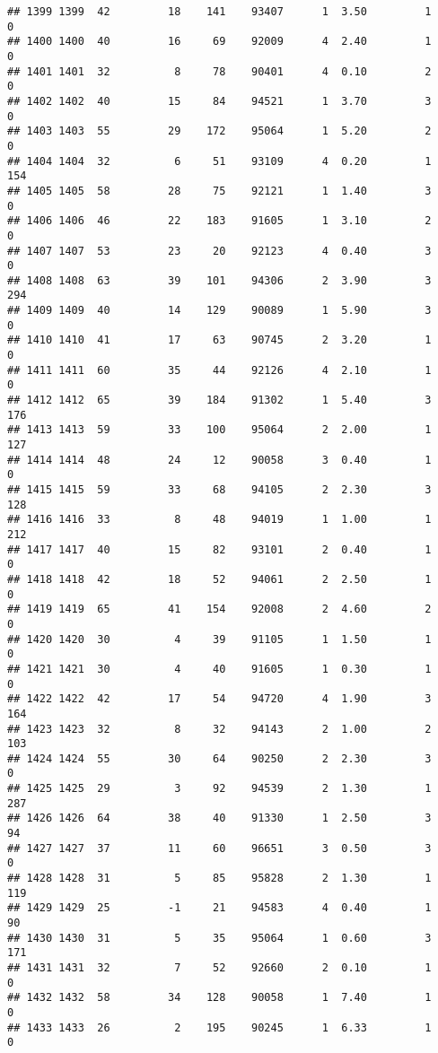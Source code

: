 \documentclass[
]{article}
\begin{document}
\begin{verbatim}
## 1399 1399  42         18    141    93407      1  3.50         1        0
## 1400 1400  40         16     69    92009      4  2.40         1        0
## 1401 1401  32          8     78    90401      4  0.10         2        0
## 1402 1402  40         15     84    94521      1  3.70         3        0
## 1403 1403  55         29    172    95064      1  5.20         2        0
## 1404 1404  32          6     51    93109      4  0.20         1      154
## 1405 1405  58         28     75    92121      1  1.40         3        0
## 1406 1406  46         22    183    91605      1  3.10         2        0
## 1407 1407  53         23     20    92123      4  0.40         3        0
## 1408 1408  63         39    101    94306      2  3.90         3      294
## 1409 1409  40         14    129    90089      1  5.90         3        0
## 1410 1410  41         17     63    90745      2  3.20         1        0
## 1411 1411  60         35     44    92126      4  2.10         1        0
## 1412 1412  65         39    184    91302      1  5.40         3      176
## 1413 1413  59         33    100    95064      2  2.00         1      127
## 1414 1414  48         24     12    90058      3  0.40         1        0
## 1415 1415  59         33     68    94105      2  2.30         3      128
## 1416 1416  33          8     48    94019      1  1.00         1      212
## 1417 1417  40         15     82    93101      2  0.40         1        0
## 1418 1418  42         18     52    94061      2  2.50         1        0
## 1419 1419  65         41    154    92008      2  4.60         2        0
## 1420 1420  30          4     39    91105      1  1.50         1        0
## 1421 1421  30          4     40    91605      1  0.30         1        0
## 1422 1422  42         17     54    94720      4  1.90         3      164
## 1423 1423  32          8     32    94143      2  1.00         2      103
## 1424 1424  55         30     64    90250      2  2.30         3        0
## 1425 1425  29          3     92    94539      2  1.30         1      287
## 1426 1426  64         38     40    91330      1  2.50         3       94
## 1427 1427  37         11     60    96651      3  0.50         3        0
## 1428 1428  31          5     85    95828      2  1.30         1      119
## 1429 1429  25         -1     21    94583      4  0.40         1       90
## 1430 1430  31          5     35    95064      1  0.60         3      171
## 1431 1431  32          7     52    92660      2  0.10         1        0
## 1432 1432  58         34    128    90058      1  7.40         1        0
## 1433 1433  26          2    195    90245      1  6.33         1        0

\end{verbatim}
\end{document}
